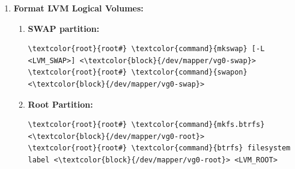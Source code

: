 \documentclass[10pt, a4paper, onecolumn, oneside, titlepage, openany]{book}
\begin{document}
\begin{enumerate}
\begin{itemize}
\begin{Verbatim}[commandchars=\\\{\}]
\textcolor{root}{root#} \textcolor{command}{lvm} vgdisplay [vg0]
\end{Verbatim}
        \item \textbf{Check LVM Logical Volumes:}
\begin{Verbatim}[commandchars=\\\{\}]
\textcolor{root}{root#} \textcolor{command}{lvm} lvdisplay
\end{Verbatim}
    \end{itemize}
    \item \textbf{Format LVM Logical Volumes:}
    \begin{enumerate}
        \item \textbf{SWAP partition:}
\begin{Verbatim}[commandchars=\\\{\}]
\textcolor{root}{root#} \textcolor{command}{mkswap} [-L <LVM_SWAP>] <\textcolor{block}{/dev/mapper/vg0-swap}>
\textcolor{root}{root#} \textcolor{command}{swapon} <\textcolor{block}{/dev/mapper/vg0-swap}>
\end{Verbatim}
        \item \textbf{Root Partition:}
\begin{Verbatim}[commandchars=\\\{\}]
\textcolor{root}{root#} \textcolor{command}{mkfs.btrfs} <\textcolor{block}{/dev/mapper/vg0-root}>
\textcolor{root}{root#} \textcolor{command}{btrfs} filesystem label <\textcolor{block}{/dev/mapper/vg0-root}> <LVM_ROOT>
\end{Verbatim}
    \end{enumerate}
\end{enumerate}
\end{document}
